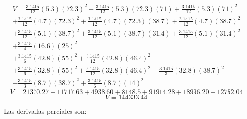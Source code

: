 \documentclass[letter,11pt]{article}
\begin{document}
\begin{equation*}
\begin{split}
    V=\frac{3.1415}{12}(5.3)(72.3)^2+\frac{3.1415}{12}(5.3)(72.3)(71)
     +\frac{3.1415}{12}(5.3)(71)^2 \\
     +\frac{3.1415}{12}(4.7)(72.3)^2+\frac{3.1415}{12}(4.7)(72.3)(38.7)
     +\frac{3.1415}{12}(4.7)(38.7)^2 \\
     +\frac{3.1415}{12}(5.1)(38.7)^2+\frac{3.1415}{12}(5.1)(38.7)(31.4)
     +\frac{3.1415}{12}(5.1)(31.4)^2 \\
     +\frac{3.1415}{4}(16.6)(25)^2 \\
     +\frac{3.1415}{6}(42.8)(55)^2+\frac{3.1415}{12}(42.8)(46.4)^2 \\
     +\frac{3.1415}{6}(32.8)(55)^2+\frac{3.1415}{12}(32.8)(46.4)^2
     -\frac{3.1415}{3}(32.8)(38.7)^2 \\
     -\frac{3.1415}{3}(8.7)(38.7)^2+\frac{3.1415}{6}(8.7)(14)^2
\end{split}
\end{equation*}
\begin{equation*}
    V = 21370.27+11717.63+4938.60+8148.5+91914.28+18996.20-12752.04
\end{equation*}
\begin{equation*}
    V = 144333.44
\end{equation*}

Las derivadas parciales son:
\end{document}
